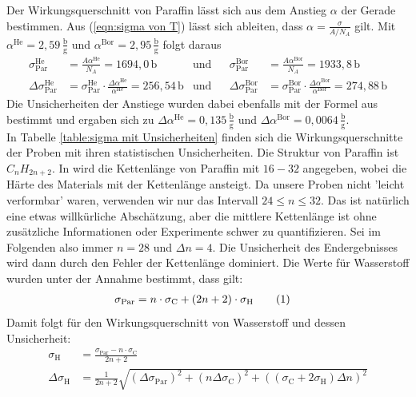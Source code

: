 \documentclass[german, parskip=full]{scrartcl}
\newcommand\numberthis{\addtocounter{equation}{1}\tag{\theequation}}
\newcommand{\tecxt}{}
\begin{document}
Der Wirkungsquerschnitt von Paraffin lässt sich aus dem Anstieg $\alpha$ der Gerade bestimmen. Aus (\ref{eqn:sigma von T}) lässt sich ableiten, dass $\alpha=\frac{\sigma}{A/N_A}$ gilt. Mit $\alpha^\tecxt\text{He}=2,59\,\frac{\tecxt\text{b}}{\tecxt\text{g}}$ und $\alpha^\tecxt\text{Bor}=2,95\,\frac{\tecxt\text{b}}{\tecxt\text{g}}$ folgt daraus
\begin{align*}
\sigma_\tecxt\text{Par}^\tecxt\text{He}&=\frac{A\alpha^\tecxt\text{He}}{N_A}=1694,0\,\tecxt\text{b}&\tecxt\text{und}&&\sigma_\tecxt\text{Par}^\tecxt\text{Bor}&=\frac{A\alpha^\tecxt\text{Bor}}{N_A}=1933,8\,\tecxt\text{b}\\
\Delta\sigma_\tecxt\text{Par}^\tecxt\text{He}&=\sigma_\tecxt\text{Par}^\tecxt\text{He}\cdot\frac{\Delta\alpha^\tecxt\text{He}}{\alpha^\tecxt\text{He}}=256,54\,\tecxt\text{b}&\tecxt\text{und}&&\Delta\sigma_\tecxt\text{Par}^\tecxt\text{Bor}&=\sigma_\tecxt\text{Par}^\tecxt\text{Bor}\cdot\frac{\Delta\alpha^\tecxt\text{Bor}}{\alpha^\tecxt\text{Bor}}=274,88\,\tecxt\text{b}
\end{align*}
Die Unsicherheiten der Anstiege wurden dabei ebenfalls mit der Formel aus \cite{Einfuehrung Praktikum} bestimmt und ergaben sich zu $\Delta\alpha^\tecxt\text{He}=0,135\,\frac{\tecxt\text{b}}{\tecxt\text{g}}$ und $\Delta\alpha^\tecxt\text{Bor}=0,0064\,\frac{\tecxt\text{b}}{\tecxt\text{g}}$.\\
In Tabelle \ref{table:sigma mit Unsicherheiten} finden sich die Wirkungsquerschnitte der Proben mit ihren statistischen Unsicherheiten. Die Struktur von Paraffin ist $C_nH_{2n+2}$. In \cite{Paraffin} wird die Kettenlänge von Paraffin mit $16-32$ angegeben, wobei die Härte des Materials mit der Kettenlänge ansteigt. Da unsere Proben nicht 'leicht verformbar' waren, verwenden wir nur das Intervall $24\le n\le 32$. Das ist natürlich eine etwas willkürliche Abschätzung, aber die mittlere Kettenlänge ist ohne zusätzliche Informationen oder Experimente schwer zu quantifizieren. Sei im Folgenden also immer $n=28$ und $\Delta n=4$. Die Unsicherheit des Endergebnisses wird dann durch den Fehler der Kettenlänge dominiert. Die Werte für Wasserstoff wurden unter der Annahme bestimmt, dass gilt:
\begin{align*}
\sigma_\tecxt\text{Par}&=n\cdot\sigma_\tecxt\text{C}+(2n+2)\cdot\sigma_\tecxt\text{H}\numberthis\label{eqn:sigma Paraffin von H und C}
\end{align*}
Damit folgt für den Wirkungsquerschnitt von Wasserstoff und dessen Unsicherheit:
\begin{align*}
\sigma_\tecxt\text{H}&=\frac{\sigma_\tecxt\text{Par}-n\cdot\sigma_\tecxt\text{C}}{2n+2}\\
\Delta\sigma_\tecxt\text{H}&=\frac{1}{2n+2}\sqrt{(\Delta\sigma_\tecxt\text{Par})^2+(n\Delta\sigma_\tecxt\text{C})^2+((\sigma_\tecxt\text{C}+2\sigma_\tecxt\text{H})\Delta n)^2}
\end{align*}
\end{document}

